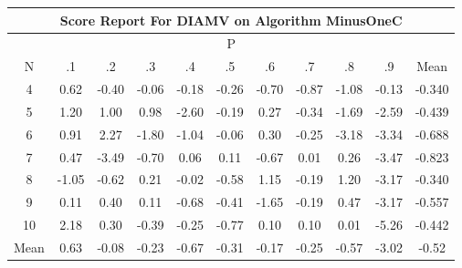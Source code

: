 \documentclass[11pt,a4paper]{report}
\begin{document}
\begin{longtable}{ | c || c | c | c | c | c | c | c | c | c || c |}
\hline
\multicolumn{11}{|c|}{ Score Report For DIAMV on Algorithm MinusOneC} \\
\hline
\multicolumn{11}{|c|}{ P } \\
\hline
N & .1 & .2 & .3 & .4 & .5 & .6 & .7 & .8 & .9 & Mean\\
 \hline
 \hline
 \endhead
  4 &  \cellcolor[HTML]{EFEFFF} 0.62 &  \cellcolor[HTML]{FFF7F7} -0.40 &  \cellcolor[HTML]{FFFFFF} -0.06 &  \cellcolor[HTML]{FFF7F7} -0.18 &  \cellcolor[HTML]{FFF7F7} -0.26 &  \cellcolor[HTML]{FFEFEF} -0.70 &  \cellcolor[HTML]{FFE7E7} -0.87 &  \cellcolor[HTML]{FFE7E7} -1.08 &  \cellcolor[HTML]{FFFFFF} -0.13 & -0.340 \\
  5 &  \cellcolor[HTML]{DFDFFF} 1.20 &  \cellcolor[HTML]{E7E7FF} 1.00 &  \cellcolor[HTML]{E7E7FF} 0.98 &  \cellcolor[HTML]{FFBFBF} -2.60 &  \cellcolor[HTML]{FFF7F7} -0.19 &  \cellcolor[HTML]{F7F7FF} 0.27 &  \cellcolor[HTML]{FFF7F7} -0.34 &  \cellcolor[HTML]{FFD7D7} -1.69 &  \cellcolor[HTML]{FFBFBF} -2.59 & -0.439 \\
  6 &  \cellcolor[HTML]{E7E7FF} 0.91 &  \cellcolor[HTML]{C7C7FF} 2.27 &  \cellcolor[HTML]{FFCFCF} -1.80 &  \cellcolor[HTML]{FFE7E7} -1.04 &  \cellcolor[HTML]{FFFFFF} -0.06 &  \cellcolor[HTML]{F7F7FF} 0.30 &  \cellcolor[HTML]{FFF7F7} -0.25 &  \cellcolor[HTML]{FFAFAF} -3.18 &  \cellcolor[HTML]{FFA7A7} -3.34 & -0.688 \\
  7 &  \cellcolor[HTML]{F7F7FF} 0.47 &  \cellcolor[HTML]{FFA7A7} -3.49 &  \cellcolor[HTML]{FFEFEF} -0.70 &  \cellcolor[HTML]{FFFFFF} 0.06 &  \cellcolor[HTML]{FFFFFF} 0.11 &  \cellcolor[HTML]{FFEFEF} -0.67 &  \cellcolor[HTML]{FFFFFF} 0.01 &  \cellcolor[HTML]{F7F7FF} 0.26 &  \cellcolor[HTML]{FFA7A7} -3.47 & -0.823 \\
  8 &  \cellcolor[HTML]{FFE7E7} -1.05 &  \cellcolor[HTML]{FFEFEF} -0.62 &  \cellcolor[HTML]{F7F7FF} 0.21 &  \cellcolor[HTML]{FFFFFF} -0.02 &  \cellcolor[HTML]{FFEFEF} -0.58 &  \cellcolor[HTML]{DFDFFF} 1.15 &  \cellcolor[HTML]{FFF7F7} -0.19 &  \cellcolor[HTML]{DFDFFF} 1.20 &  \cellcolor[HTML]{FFAFAF} -3.17 & -0.340 \\
  9 &  \cellcolor[HTML]{FFFFFF} 0.11 &  \cellcolor[HTML]{F7F7FF} 0.40 &  \cellcolor[HTML]{FFFFFF} 0.11 &  \cellcolor[HTML]{FFEFEF} -0.68 &  \cellcolor[HTML]{FFF7F7} -0.41 &  \cellcolor[HTML]{FFD7D7} -1.65 &  \cellcolor[HTML]{FFF7F7} -0.19 &  \cellcolor[HTML]{F7F7FF} 0.47 &  \cellcolor[HTML]{FFAFAF} -3.17 & -0.557 \\
  10 &  \cellcolor[HTML]{C7C7FF} 2.18 &  \cellcolor[HTML]{F7F7FF} 0.30 &  \cellcolor[HTML]{FFF7F7} -0.39 &  \cellcolor[HTML]{FFF7F7} -0.25 &  \cellcolor[HTML]{FFEFEF} -0.77 &  \cellcolor[HTML]{FFFFFF} 0.10 &  \cellcolor[HTML]{FFFFFF} 0.10 &  \cellcolor[HTML]{FFFFFF} 0.01 &  \cellcolor[HTML]{FF7878} -5.26 & -0.442 \\
 \hline
 \hline
Mean &  \cellcolor[HTML]{EFEFFF} 0.63 &  \cellcolor[HTML]{FFFFFF} -0.08 &  \cellcolor[HTML]{FFF7F7} -0.23 &  \cellcolor[HTML]{FFEFEF} -0.67 &  \cellcolor[HTML]{FFF7F7} -0.31 &  \cellcolor[HTML]{FFF7F7} -0.17 &  \cellcolor[HTML]{FFF7F7} -0.25 &  \cellcolor[HTML]{FFEFEF} -0.57 &  \cellcolor[HTML]{FFAFAF} -3.02 &  \cellcolor[HTML]{FFEFEF} -0.52
\end{longtable}
\end{document}
